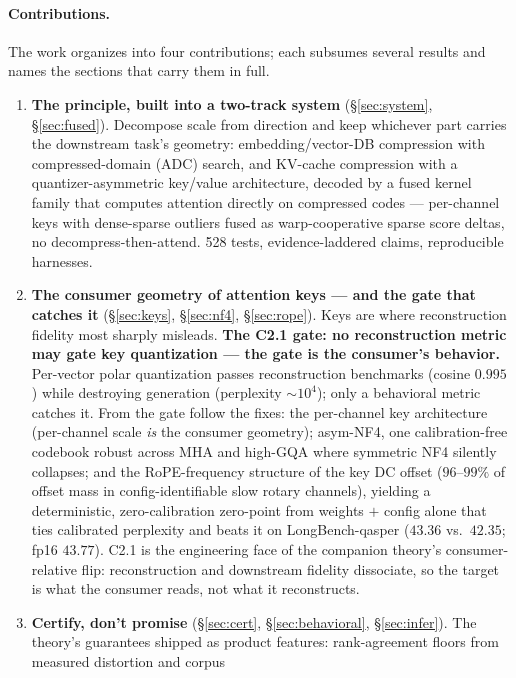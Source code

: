 \documentclass[11pt]{article}
\begin{document}
\paragraph{Contributions.} The work organizes into four contributions; each
subsumes several results and names the sections that carry them in full.

\begin{enumerate}
\item[\textbf{C1}] \textbf{The principle, built into a two-track system}
  (\S\ref{sec:system}, \S\ref{sec:fused}). Decompose scale from direction and
  keep whichever part carries the downstream task's geometry: embedding/vector-DB
  compression with compressed-domain (ADC) search, and KV-cache compression with a
  quantizer-asymmetric key/value architecture, decoded by a fused kernel family
  that computes attention directly on compressed codes --- per-channel keys with
  dense-sparse outliers fused as warp-cooperative sparse score deltas, no
  decompress-then-attend. 528 tests, evidence-laddered claims, reproducible harnesses.
\item[\textbf{C2}] \textbf{The consumer geometry of attention keys --- and the
  gate that catches it} (\S\ref{sec:keys}, \S\ref{sec:nf4}, \S\ref{sec:rope}).
  Keys are where reconstruction fidelity most sharply misleads.
  \textbf{The C2.1 gate: no reconstruction metric may gate key quantization ---
  the gate is the consumer's behavior.} Per-vector polar quantization passes
  reconstruction benchmarks (cosine $0.995$) while destroying generation
  (perplexity ${\sim}10^4$); only a behavioral metric catches it. From the gate
  follow the fixes: the per-channel key architecture (per-channel scale
  \emph{is} the consumer geometry); asym-NF4, one calibration-free codebook
  robust across MHA and high-GQA where symmetric NF4 silently collapses; and the
  RoPE-frequency structure of the key DC offset ($96$--$99\%$ of offset mass in
  config-identifiable slow rotary channels), yielding a deterministic,
  zero-calibration zero-point from weights $+$ config alone that ties calibrated
  perplexity and beats it on LongBench-qasper ($43.36$ vs.\ $42.35$; fp16
  $43.77$). C2.1 is the engineering face of the companion theory's
  consumer-relative flip: reconstruction and downstream fidelity dissociate, so
  the target is what the consumer reads, not what it reconstructs.
\item[\textbf{C3}] \textbf{Certify, don't promise} (\S\ref{sec:cert},
  \S\ref{sec:behavioral}, \S\ref{sec:infer}). The theory's guarantees shipped as
  product features: rank-agreement floors from measured distortion and corpus

\end{enumerate}
\end{document}
